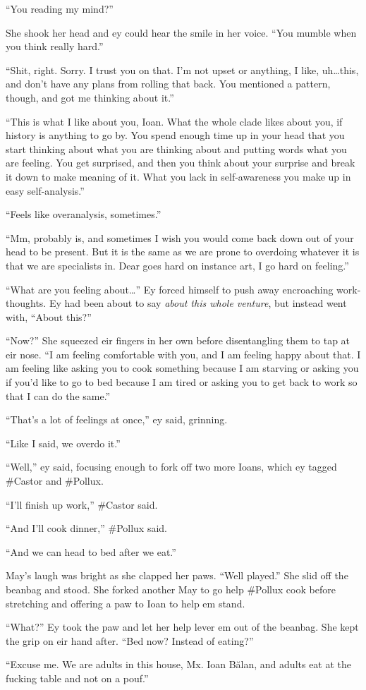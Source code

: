 ``You reading my mind?''

She shook her head and ey could hear the smile in her voice. ``You mumble when you think really hard.''

``Shit, right. Sorry. I trust you on that. I'm not upset or anything, I like, uh\ldots this, and don't have any plans from rolling that back. You mentioned a pattern, though, and got me thinking about it.''

``This is what I like about you, Ioan. What the whole clade likes about you, if history is anything to go by. You spend enough time up in your head that you start thinking about what you are thinking about and putting words what you are feeling. You get surprised, and then you think about your surprise and break it down to make meaning of it. What you lack in self-awareness you make up in easy self-analysis.''

``Feels like overanalysis, sometimes.''

``Mm, probably is, and sometimes I wish you would come back down out of your head to be present. But it is the same as we are prone to overdoing whatever it is that we are specialists in. Dear goes hard on instance art, I go hard on feeling.''

``What are you feeling about\ldots{}'' Ey forced himself to push away encroaching work-thoughts. Ey had been about to say \emph{about this whole venture}, but instead went with, ``About this?''

``Now?'' She squeezed eir fingers in her own before disentangling them to tap at eir nose. ``I am feeling comfortable with you, and I am feeling happy about that. I am feeling like asking you to cook something because I am starving or asking you if you'd like to go to bed because I am tired or asking you to get back to work so that I can do the same.''

``That's a lot of feelings at once,'' ey said, grinning.

``Like I said, we overdo it.''

``Well,'' ey said, focusing enough to fork off two more Ioans, which ey tagged \#Castor and \#Pollux.

``I'll finish up work,'' \#Castor said.

``And I'll cook dinner,'' \#Pollux said.

``And we can head to bed after we eat.''

May's laugh was bright as she clapped her paws. ``Well played.'' She slid off the beanbag and stood. She forked another May to go help \#Pollux cook before stretching and offering a paw to Ioan to help em stand.

``What?'' Ey took the paw and let her help lever em out of the beanbag. She kept the grip on eir hand after. ``Bed now? Instead of eating?''

``Excuse me. We are adults in this house, Mx. Ioan Bălan, and adults eat at the fucking table and not on a pouf.''
